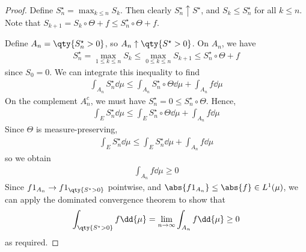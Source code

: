 \begin{proof}
    Define $S_n^\star = \max_{k \leq n} S_k$.
    Then clearly $S_n^\star \uparrow S^\star$, and $S_k \leq S_n^\star$ for all $k \leq n$.
    Note that $S_{k+1} = S_k \circ \Theta + f \leq S_n^\star \circ \Theta + f$.

    Define $A_n = \qty{S_n^\star > 0}$, so $A_n \uparrow \qty{S^\star > 0}$.
    On $A_n$, we have
    \begin{align*}
        S_n^\star = \max_{1 \leq k \leq n} S_k \leq \max_{0 \leq k \leq n} S_{k+1} \leq S_n^\star \circ \Theta + f
    \end{align*}
    since $S_0 = 0$.
    We can integrate this inequality to find
    \begin{align*}
        \int_{A_n} S_n^\star \dd{\mu} \leq \int_{A_n} S_n^\star \circ \Theta \dd{\mu} + \int_{A_n} f \dd{\mu}
    \end{align*}
    On the complement $A_n^c$, we must have $S_n^\star = 0 \leq S_n^\star \circ \Theta$.
    Hence,
    \begin{align*}
        \int_E S_n^\star \dd{\mu} \leq \int_E S_n^\star \circ \Theta \dd{\mu} + \int_{A_n} f \dd{\mu}
    \end{align*}
    Since $\Theta$ is measure-preserving,
    \begin{align*}
        \int_E S_n^\star \dd{\mu} \leq \int_E S_n^\star \dd{\mu} + \int_{A_n} f \dd{\mu}
    \end{align*}
    so we obtain
    \begin{align*}
        \int_{A_n} f \dd{\mu} \geq 0
    \end{align*}
    Since $f 1_{A_n} \to f 1_{\qty{S^\star > 0}}$ pointwise, and $\abs{f 1_{A_n}} \leq \abs{f} \in L^1(\mu)$, we can apply the dominated convergence theorem to show that
    \begin{align*}
        \int_{\qty{S^\star > 0}} f \dd{\mu} = \lim_{n \to \infty} \int_{A_n} f \dd{\mu} \geq 0
    \end{align*}
    as required.
\end{proof}

